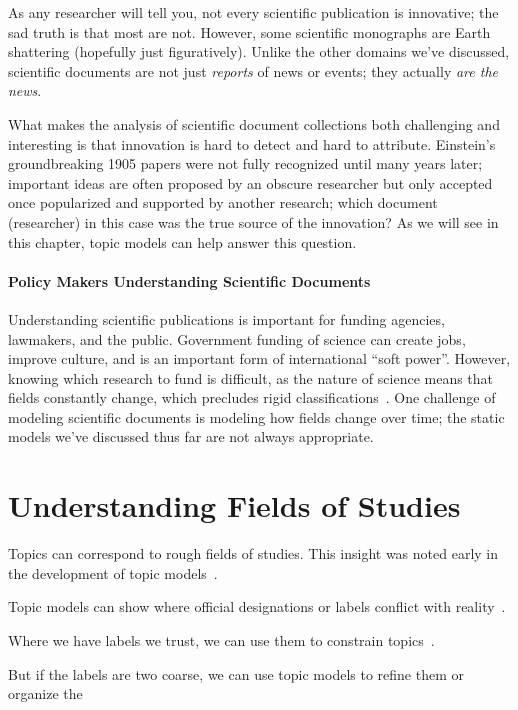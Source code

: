 As any researcher will tell you, not every scientific publication is innovative;
the sad truth is that most are not.  However, some scientific monographs are
Earth shattering (hopefully just figuratively).  Unlike the other domains we've
discussed, scientific documents are not just \emph{reports} of news or events;
they actually \emph{are the news}.

What makes the analysis of scientific document collections both challenging and
interesting is that innovation is hard to detect and hard to attribute.
Einstein's groundbreaking 1905 papers were not fully recognized until many years
later; important ideas are often proposed by an obscure researcher but only accepted
once popularized and supported by another research; which document (researcher)
in this case was the true source of the innovation?  As we will see in this
chapter, topic models can help answer this question.

\paragraph{Policy Makers Understanding Scientific Documents}

Understanding scientific publications is important for funding agencies,
lawmakers, and the public.  Government funding of science can create jobs,
improve culture, and is an important form of international ``soft power''.
However, knowing which research to fund is difficult, as the nature of science
means that fields constantly change, which precludes rigid
classifications~\citep{szostak-04}.  One challenge of modeling scientific
documents is modeling how fields change over time; the static models we've
discussed thus far are not always appropriate.

\section{Understanding Fields of Studies}

Topics can correspond to rough fields of studies.  This insight was
noted early in the development of topic models~\citep{griffiths-04}.

Topic models can show where official designations or labels conflict
with reality~\citep{talley-11}.

Where we have labels we trust, we can use them to constrain
topics~\citep{ramage-09}.

But if the labels are two coarse, we can use topic models to refine
them or organize the\citep{Nguyen:Boyd-Graber:Resnik:Chang-2014}

